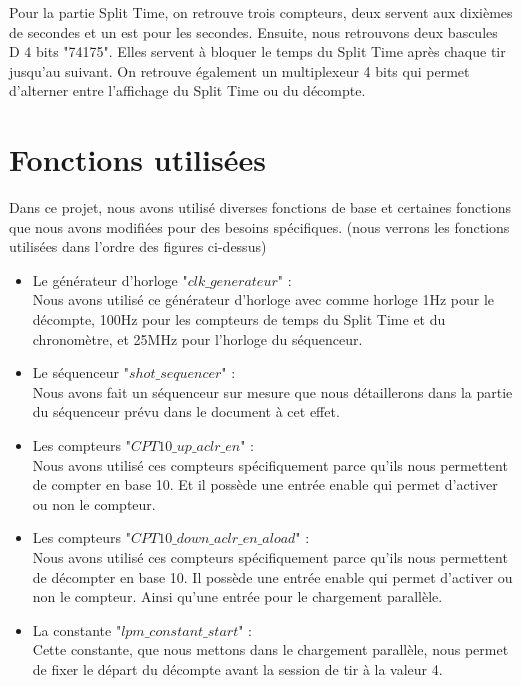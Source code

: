 \documentclass{rapport}
\begin{document}
Pour la partie Split Time, on retrouve trois compteurs, deux servent aux dixièmes de secondes et un est pour les secondes. Ensuite, nous retrouvons deux bascules D 4 bits "74175". Elles servent à bloquer le temps du Split Time après chaque tir jusqu'au suivant. On retrouve également un multiplexeur 4 bits qui permet d'alterner entre l'affichage du Split Time ou du décompte.

\section{Fonctions utilisées}

Dans ce projet, nous avons utilisé diverses fonctions de base et certaines fonctions que nous avons modifiées pour des besoins spécifiques. (nous verrons les fonctions utilisées dans l'ordre des figures ci-dessus)
\begin{itemize}
    \item Le générateur d'horloge "$clk\_generateur$" : \\
    Nous avons utilisé ce générateur d'horloge avec comme horloge 1Hz pour le décompte, 100Hz pour les compteurs de temps du Split Time et du chronomètre, et 25MHz pour l'horloge du séquenceur. \\

    \item Le séquenceur "$shot\_sequencer$" : \\
    Nous avons fait un séquenceur sur mesure que nous détaillerons dans la partie du séquenceur prévu dans le document à cet effet. \\

    \item Les compteurs "$CPT10\_up\_aclr\_en$" : \\
    Nous avons utilisé ces compteurs spécifiquement parce qu'ils nous permettent de compter en base 10. Et il possède une entrée enable qui permet d'activer ou non le compteur. \\
    
    \item Les compteurs "$CPT10\_down\_aclr\_en\_aload$" : \\
    Nous avons utilisé ces compteurs spécifiquement parce qu'ils nous permettent de décompter en base 10. Il possède une entrée enable qui permet d'activer ou non le compteur. Ainsi qu'une entrée pour le chargement parallèle. \\

    \item La constante "$lpm\_constant\_start$" : \\
    Cette constante, que nous mettons dans le chargement parallèle, nous permet de fixer le départ du décompte avant la session de tir à la valeur 4. \\


\end{itemize}
\end{document}
